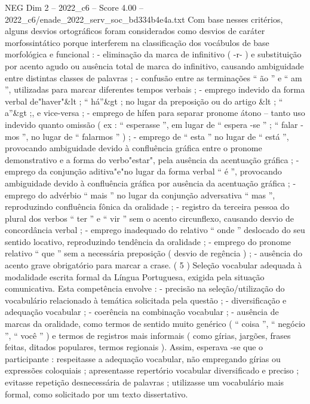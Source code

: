 \begin{textsample}{NEG Dim 2 – 2022\_c6 – Score 4.00 – 2022\_c6/enade\_2022\_serv\_soc\_bd334b4e4a.txt}
Com base nesses critérios, alguns desvios ortográficos foram considerados como desvios de caráter morfossintático porque interferem na classificação dos vocábulos de base morfológica e funcional : - eliminação da marca de infinitivo ( -r- ) e substituição por acento agudo ou ausência total de marca do infinitivo, causando ambiguidade entre distintas classes de palavras ; - confusão entre as terminações “ ão ” e “ am ”, utilizadas para marcar diferentes tempos verbais ; - emprego indevido da forma verbal de"haver"\&lt ; “ há”\&gt ; no lugar da preposição ou do artigo \&lt ; “ a”\&gt ;, e vice-versa ; - emprego de hífen para separar pronome átono – tanto uso indevido quanto omissão ( ex : “ esperasse ”, em lugar de “ espera -se ” ; “ falar -mos ”, no lugar de “ falarmos ” ) ; - emprego de “ esta ” no lugar de “ está ”, provocando ambiguidade devido à confluência gráfica entre o pronome demonstrativo e a forma do verbo"estar", pela ausência da acentuação gráfica ; - emprego da conjunção aditiva"e"no lugar da forma verbal “ é ”, provocando ambiguidade devido à confluência gráfica por ausência da acentuação gráfica ; - emprego do advérbio “ mais ” no lugar da conjunção adversativa “ mas ”, reproduzindo confluência fônica da oralidade ; - registro da terceira pessoa do plural dos verbos “ ter ” e “ vir ” sem o acento circunflexo, causando desvio de concordância verbal ; - emprego inadequado do relativo “ onde ” deslocado do seu sentido locativo, reproduzindo tendência da oralidade ; - emprego do pronome relativo “ que ” sem a necessária preposição ( desvio de regência ) ; - ausência do acento grave obrigatório para marcar a crase. ( 5 ) Seleção vocabular adequada à modalidade escrita formal da Língua Portuguesa, exigida pela situação comunicativa.
Esta competência envolve : - precisão na seleção/utilização do vocabulário relacionado à temática solicitada pela questão ; - diversificação e adequação vocabular ; - coerência na combinação vocabular ; - ausência de marcas da oralidade, como termos de sentido muito genérico ( “ coisa ”, “ negócio ”, “ você ” ) e termos de registros mais informais ( como gírias, jargões, frases feitas, ditados populares, termos regionais ).
Assim, esperava -se que o participante : respeitasse a adequação vocabular, não empregando gírias ou expressões coloquiais ; apresentasse repertório vocabular diversificado e preciso ; evitasse repetição desnecessária de palavras ; utilizasse um vocabulário mais formal, como solicitado por um texto dissertativo.

\end{textsample}

